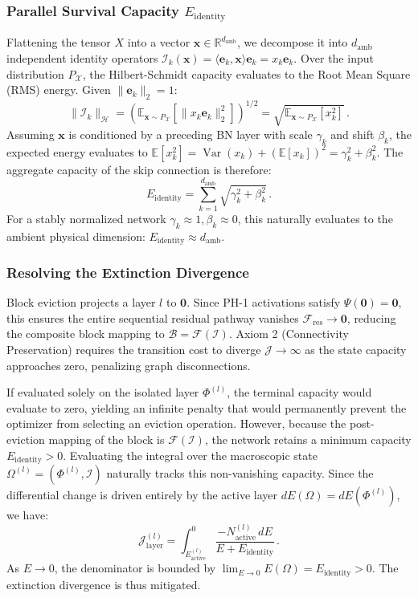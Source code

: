 \documentclass[11pt, a4paper, copyright, gdm]{google}
\newcommand{\eVect}{\boldsymbol{e}}
\newcommand{\xVect}{\boldsymbol{x}}
\newcommand{\zeroVect}{\boldsymbol{0}}
\newcommand{\calB}{\mathcal{B}}
\newcommand{\calF}{\mathcal{F}}
\newcommand{\calH}{\mathcal{H}}
\newcommand{\calI}{\mathcal{I}}
\newcommand{\calJ}{\mathcal{J}}
\newcommand{\calX}{\mathcal{X}}
\newcommand{\R}{\mathbb{R}}
\newcommand{\E}{\mathbb{E}}
\DeclareMathOperator{\Var}{Var}
\theoremstyle{definition}
\begin{document}
\subsubsection{Parallel Survival Capacity $E_{\text{identity}}$}
Flattening the tensor $X$ into a vector $\xVect \in \R^{d_{\text{amb}}}$, we decompose it into $d_{\text{amb}}$ independent identity operators $\calI_k(\xVect) = \langle \eVect_k, \xVect \rangle \eVect_k = x_k \eVect_k$. Over the input distribution $P_{\calX}$, the Hilbert-Schmidt capacity evaluates to the Root Mean Square (RMS) energy. Given $\|\eVect_k\|_2 = 1$:
\begin{equation}
    \|\calI_k\|_{\calH} = \left( \E_{\xVect \sim P_{\calX}} [ \|x_k \eVect_k\|_2^2 ] \right)^{1/2} = \sqrt{ \E_{\xVect \sim P_{\calX}} [ x_k^2 ] } \,.
\end{equation}
Assuming $\xVect$ is conditioned by a preceding BN layer with scale $\gamma_k$ and shift $\beta_k$, the expected energy evaluates to $\E[x_k^2] = \Var(x_k) + (\E[x_k])^2 = \gamma_k^2 + \beta_k^2$. The aggregate capacity of the skip connection is therefore:
\begin{equation}
    E_{\text{identity}} = \sum_{k=1}^{d_{\text{amb}}} \sqrt{\gamma_k^2 + \beta_k^2} \,.
\end{equation}
For a stably normalized network $\gamma_k \approx 1, \beta_k \approx 0$, this naturally evaluates to the ambient physical dimension: $E_{\text{identity}} \approx d_{\text{amb}}$.

\subsubsection{Resolving the Extinction Divergence}
Block eviction projects a layer $l$ to $\zeroVect$. Since PH-1 activations satisfy $\Psi(\zeroVect) = \zeroVect$, this ensures the entire sequential residual pathway vanishes $\calF_{\text{res}} \to \zeroVect$, reducing the composite block mapping to $\calB = \calF(\calI)$. Axiom 2 (Connectivity Preservation) requires the transition cost to diverge $\calJ \to \infty$ as the state capacity approaches zero, penalizing graph disconnections. 

If evaluated solely on the isolated layer $\Phi^{(l)}$, the terminal capacity would evaluate to zero, yielding an infinite penalty that would permanently prevent the optimizer from selecting an eviction operation. However, because the post-eviction mapping of the block is $\calF(\calI)$, the network retains a minimum capacity $E_{\text{identity}} > 0$. Evaluating the integral over the macroscopic state $\Omega^{(l)} = (\Phi^{(l)}, \calI)$ naturally tracks this non-vanishing capacity. Since the differential change is driven entirely by the active layer $dE(\Omega) = dE(\Phi^{(l)})$, we have:
\begin{equation}
    \calJ_{\text{layer}}^{(l)} = \int_{E_{\text{active}}^{(l)}}^{0} \frac{-N_{\text{active}}^{(l)} \, dE}{E + E_{\text{identity}}} \,.
\end{equation}
As $E \to 0$, the denominator is bounded by $\lim_{E \to 0} E(\Omega) = E_{\text{identity}} > 0$. The extinction divergence is thus mitigated.
\end{document}
